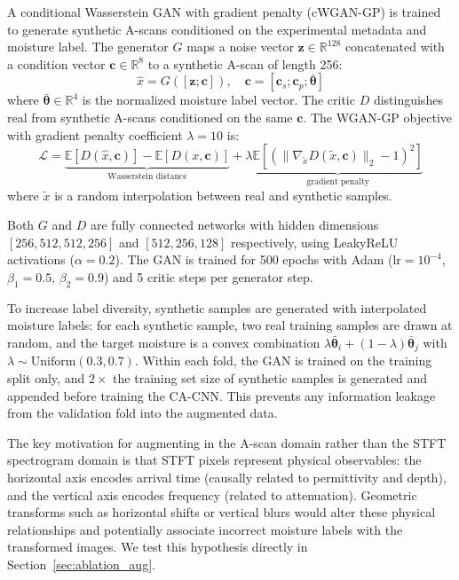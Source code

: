 \documentclass[review]{elsarticle}
\begin{document}
A conditional Wasserstein GAN with gradient penalty (cWGAN-GP) is trained to generate synthetic A-scans conditioned on the experimental metadata and moisture label. The generator $G$ maps a noise vector $\mathbf{z} \in \mathbb{R}^{128}$ concatenated with a condition vector $\mathbf{c} \in \mathbb{R}^8$ to a synthetic A-scan of length 256:
\begin{equation}
    \hat{x} = G([\mathbf{z}; \mathbf{c}]), \quad \mathbf{c} = [\mathbf{c}_s; \mathbf{c}_p; \bar{\boldsymbol{\theta}}]
\end{equation}
where $\bar{\boldsymbol{\theta}} \in \mathbb{R}^4$ is the normalized moisture label vector. The critic $D$ distinguishes real from synthetic A-scans conditioned on the same $\mathbf{c}$. The WGAN-GP objective with gradient penalty coefficient $\lambda = 10$ is:
\begin{equation}
    \mathcal{L} = \underbrace{\mathbb{E}[D(\hat{x}, \mathbf{c})] - \mathbb{E}[D(x, \mathbf{c})]}_{\text{Wasserstein distance}} + \lambda \underbrace{\mathbb{E}\left[(\|\nabla_{\tilde{x}} D(\tilde{x}, \mathbf{c})\|_2 - 1)^2\right]}_{\text{gradient penalty}}
\end{equation}
where $\tilde{x}$ is a random interpolation between real and synthetic samples.

Both $G$ and $D$ are fully connected networks with hidden dimensions $[256, 512, 512, 256]$ and $[512, 256, 128]$ respectively, using LeakyReLU activations ($\alpha = 0.2$). The GAN is trained for 500 epochs with Adam ($\text{lr} = 10^{-4}$, $\beta_1 = 0.5$, $\beta_2 = 0.9$) and 5 critic steps per generator step.

To increase label diversity, synthetic samples are generated with interpolated moisture labels: for each synthetic sample, two real training samples are drawn at random, and the target moisture is a convex combination $\lambda \bar{\boldsymbol{\theta}}_i + (1-\lambda)\bar{\boldsymbol{\theta}}_j$ with $\lambda \sim \text{Uniform}(0.3, 0.7)$. Within each fold, the GAN is trained on the training split only, and $2\times$ the training set size of synthetic samples is generated and appended before training the CA-CNN. This prevents any information leakage from the validation fold into the augmented data.

The key motivation for augmenting in the A-scan domain rather than the STFT spectrogram domain is that STFT pixels represent physical observables: the horizontal axis encodes arrival time (causally related to permittivity and depth), and the vertical axis encodes frequency (related to attenuation). Geometric transforms such as horizontal shifts or vertical blurs would alter these physical relationships and potentially associate incorrect moisture labels with the transformed images. We test this hypothesis directly in Section~\ref{sec:ablation_aug}.
\end{document}
